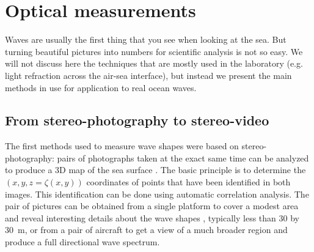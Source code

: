 \section{Optical measurements}
Waves are usually the first thing that you see when looking at the sea. But turning beautiful pictures into numbers for scientific analysis is 
not so easy. We will not discuss here the techniques that are mostly used in the laboratory (e.g. light refraction across the air-sea interface), but 
instead we present the main methods in use for application to real ocean waves. 
\subsection{From stereo-photography to stereo-video}
The first methods used to measure wave shapes were based on stereo-photography: pairs of photographs taken at the exact same time can be analyzed to 
produce a 3D map of the sea surface \citep{Schumacher1939}. The basic principle is to determine the $(x,y,z=\zeta(x,y))$ coordinates of points that have been 
identified in both images. This identification can be done using automatic correlation analysis. The pair of pictures can be obtained from a single platform to cover a modest area and reveal interesting 
details about the wave shapes \citep{Banner&al.1989}, typically less than 30 by 30~m, 
or from a pair of aircraft to get a view of a much broader region \citep{Cote&al.1960,Holthuijsen1983b} and produce a full directional 
wave spectrum. 
